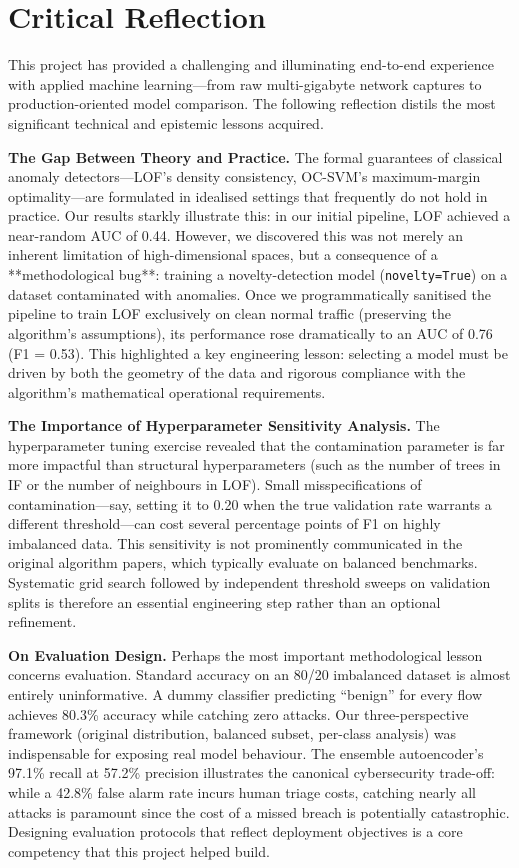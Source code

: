 \section{Critical Reflection}

This project has provided a challenging and illuminating end-to-end experience with applied machine learning—from raw multi-gigabyte network captures to production-oriented model comparison. The following reflection distils the most significant technical and epistemic lessons acquired.

\textbf{The Gap Between Theory and Practice.}
The formal guarantees of classical anomaly detectors—LOF's density consistency, OC-SVM's maximum-margin optimality—are formulated in idealised settings that frequently do not hold in practice. Our results starkly illustrate this: in our initial pipeline, LOF achieved a near-random AUC of 0.44. However, we discovered this was not merely an inherent limitation of high-dimensional spaces, but a consequence of a **methodological bug**: training a novelty-detection model (\texttt{novelty=True}) on a dataset contaminated with anomalies. Once we programmatically sanitised the pipeline to train LOF exclusively on clean normal traffic (preserving the algorithm's assumptions), its performance rose dramatically to an AUC of 0.76 (F1 = 0.53). This highlighted a key engineering lesson: selecting a model must be driven by both the geometry of the data and rigorous compliance with the algorithm's mathematical operational requirements.

\textbf{The Importance of Hyperparameter Sensitivity Analysis.}
The hyperparameter tuning exercise revealed that the contamination parameter is far more impactful than structural hyperparameters (such as the number of trees in IF or the number of neighbours in LOF). Small misspecifications of contamination—say, setting it to 0.20 when the true validation rate warrants a different threshold—can cost several percentage points of F1 on highly imbalanced data. This sensitivity is not prominently communicated in the original algorithm papers, which typically evaluate on balanced benchmarks. Systematic grid search followed by independent threshold sweeps on validation splits is therefore an essential engineering step rather than an optional refinement.

\textbf{On Evaluation Design.}
Perhaps the most important methodological lesson concerns evaluation. Standard accuracy on an 80/20 imbalanced dataset is almost entirely uninformative. A dummy classifier predicting ``benign'' for every flow achieves 80.3\% accuracy while catching zero attacks. Our three-perspective framework (original distribution, balanced subset, per-class analysis) was indispensable for exposing real model behaviour. The ensemble autoencoder's 97.1\% recall at 57.2\% precision illustrates the canonical cybersecurity trade-off: while a 42.8\% false alarm rate incurs human triage costs, catching nearly all attacks is paramount since the cost of a missed breach is potentially catastrophic. Designing evaluation protocols that reflect deployment objectives is a core competency that this project helped build.

